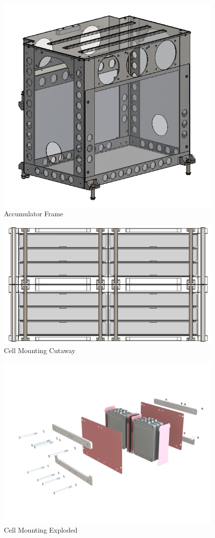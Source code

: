 \documentclass{article}
\begin{document}
            \begin{figure}[H]
                \centering
                \includegraphics[width = 0.5 \textwidth]{accumulator_frame}
                \caption{Accumulator Frame}
                \label{accframe}
            \end{figure}

            \begin{figure}[H]
                \centering
                \includegraphics[width = 0.5 \textwidth]{cellmount_cutaway}
                \caption{Cell Mounting Cutaway}
                \label{cellcut}
            \end{figure}
            
            \begin{figure}[H]
                \centering
                \includegraphics[width = 0.5 \textwidth]{cellmount_exploded}
                \caption{Cell Mounting Exploded}
                \label{cellexp}
            \end{figure}
\end{document}
